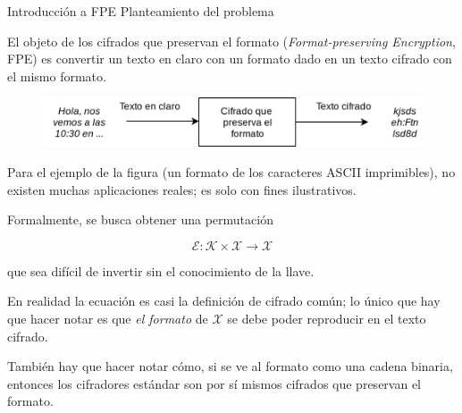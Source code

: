 \begin{frame}{Introducción a FPE}
  {Planteamiento del problema}

  El objeto de los cifrados que preservan el formato
  (\textit{Format-preserving Encryption}, FPE) es convertir un texto en claro
  con un formato dado en un texto cifrado con el mismo formato.

  \begin{figure}[H]
    \begin{center}
      \includegraphics[width=0.75\linewidth]{diagramas/cifrador_formato.png}
    \end{center}
  \end{figure}

  {
    Para el ejemplo de la figura (un formato de los caracteres ASCII
    imprimibles), no existen muchas aplicaciones reales; es solo con
    fines ilustrativos.
  }


  Formalmente, se busca obtener una permutación

  $$ \mathcal{E}: \mathcal{K} \times \mathcal{X} \rightarrow \mathcal{X} $$

  que sea difícil de invertir sin el conocimiento de la llave.

  {
    En realidad la ecuación es casi la definición de cifrado común; lo único
    que hay que hacer notar es que \textit{el formato} de $ \mathcal{X} $
    se debe poder reproducir en el texto cifrado.

    También hay que hacer notar cómo, si se ve al formato como una cadena
    binaria, entonces los cifradores estándar son por sí mismos cifrados que
    preservan el formato.
  }

\end{frame}

